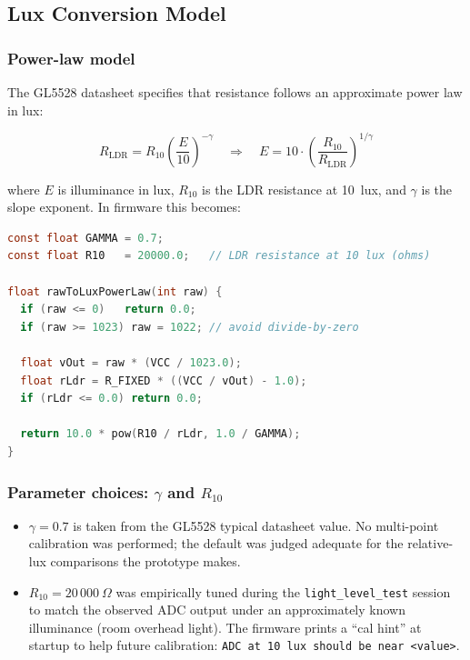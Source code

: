 \documentclass[12pt,letterpaper]{article}
\begin{document}
\subsection{Lux Conversion Model}
\label{sec:lux-model}

\subsubsection{Power-law model}

The GL5528 datasheet specifies that resistance follows an approximate power law
in lux:

\[
  R_{\mathrm{LDR}} = R_{10} \left(\frac{E}{10}\right)^{-\gamma}
  \quad \Longrightarrow \quad
  E = 10 \cdot \left(\frac{R_{10}}{R_{\mathrm{LDR}}}\right)^{1/\gamma}
\]

where $E$ is illuminance in lux, $R_{10}$ is the LDR resistance at 10~lux, and
$\gamma$ is the slope exponent. In firmware this becomes:

\begin{lstlisting}[language=C, caption={Power-law lux conversion in firmware}]
const float GAMMA = 0.7;
const float R10   = 20000.0;   // LDR resistance at 10 lux (ohms)

float rawToLuxPowerLaw(int raw) {
  if (raw <= 0)   return 0.0;
  if (raw >= 1023) raw = 1022; // avoid divide-by-zero

  float vOut = raw * (VCC / 1023.0);
  float rLdr = R_FIXED * ((VCC / vOut) - 1.0);
  if (rLdr <= 0.0) return 0.0;

  return 10.0 * pow(R10 / rLdr, 1.0 / GAMMA);
}
\end{lstlisting}

\subsubsection{Parameter choices: $\gamma$ and $R_{10}$}

\begin{itemize}
  \item $\gamma = 0.7$ is taken from the GL5528 typical datasheet value. No
        multi-point calibration was performed; the default was judged adequate
        for the relative-lux comparisons the prototype makes.
  \item $R_{10} = 20\,000~\Omega$ was empirically tuned during the
        \texttt{light\_level\_test} session to match the observed ADC output
        under an approximately known illuminance (room overhead light).
        The firmware prints a ``cal hint'' at startup to help future calibration:
        \lstinline|ADC at 10 lux should be near <value>|.
\end{itemize}
\end{document}
